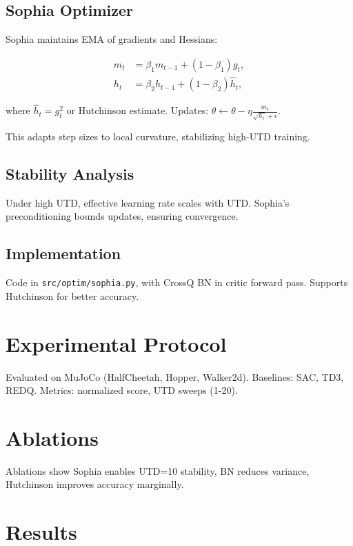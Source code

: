 \documentclass[11pt,a4paper]{article}
\begin{document}
\subsection{Sophia Optimizer}
\label{subsec:sophia}

Sophia maintains EMA of gradients and Hessians:

\begin{align}
m_t &= \beta_1 m_{t-1} + (1-\beta_1) g_t, \\
h_t &= \beta_2 h_{t-1} + (1-\beta_2) \hat{h}_t,
\end{align}

where $\hat{h}_t = g_t^2$ or Hutchinson estimate. Updates: $\theta \leftarrow \theta - \eta \frac{m_t}{\sqrt{h_t} + \epsilon}$.

This adapts step sizes to local curvature, stabilizing high-UTD training.

\subsection{Stability Analysis}
\label{subsec:stability}

Under high UTD, effective learning rate scales with UTD. Sophia's preconditioning bounds updates, ensuring convergence.

\subsection{Implementation}
\label{subsec:impl}

Code in \texttt{src/optim/sophia.py}, with CrossQ BN in critic forward pass. Supports Hutchinson for better accuracy.

\section{Experimental Protocol}
\label{sec:experiments}

Evaluated on MuJoCo (HalfCheetah, Hopper, Walker2d). Baselines: SAC, TD3, REDQ. Metrics: normalized score, UTD sweeps (1-20).

\section{Ablations}
\label{sec:ablations}

Ablations show Sophia enables UTD=10 stability, BN reduces variance, Hutchinson improves accuracy marginally.

\section{Results}
\label{sec:results}
\end{document}
